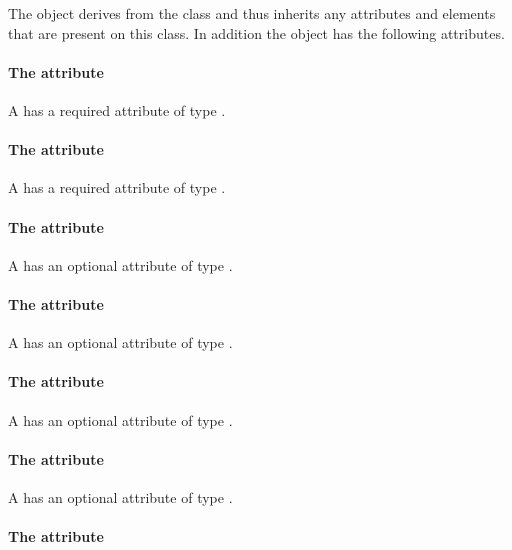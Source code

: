 
The \Text object derives from the  class and
thus inherits any attributes and elements that are present on this
class.
In addition the \Text object has the following attributes.

\paragraph{The \fixttspace{} attribute}

A \Text has a required attribute  of type \RelAbsVector.

\paragraph{The \fixttspace{} attribute}

A \Text has a required attribute  of type \RelAbsVector.

\paragraph{The \fixttspace{} attribute}

A \Text has an optional attribute  of type \RelAbsVector.

\paragraph{The \fixttspace{} attribute}

A \Text has an optional attribute  of type
\FontFamily.

\paragraph{The \fixttspace{} attribute}

A \Text has an optional attribute  of type
\FontWeight.

\paragraph{The \fixttspace{} attribute}

A \Text has an optional attribute  of type \FontStyle.

\paragraph{The \fixttspace{} attribute}

